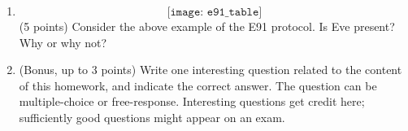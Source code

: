 \documentclass[12pt]{article}
\begin{document}
\begin{enumerate}[font=\bfseries]
    \item \[\texttt{[image: e91\_table]}\]
    (5 points) Consider the above example of the E91 protocol. Is Eve present? Why or why not?
    \item (Bonus, up to 3 points) Write one interesting question related to the content of this homework, and indicate the correct answer. The question can be multiple-choice or free-response.  Interesting questions get credit here;  sufficiently good questions might appear on an exam.
\end{enumerate}
\end{document}
